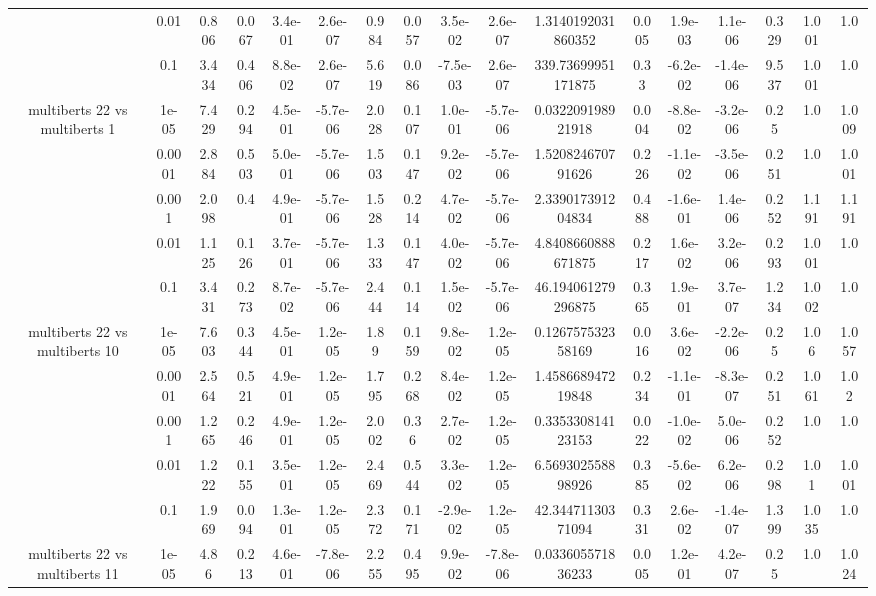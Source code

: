 \begin{tabular}{|c|c|c|c|c|c|c|c|c|c|c|c|c|c|c|c|c|}
 & 0.01 & 0.806 & 0.067 & 3.4e-01 & 2.6e-07 & 0.984 & 0.057 & 3.5e-02 & 2.6e-07 & 1.3140192031860352 & 0.005 & 1.9e-03 & 1.1e-06 & 0.329 & 1.001 & 1.0 \\
 & 0.1 & 3.434 & 0.406 & 8.8e-02 & 2.6e-07 & 5.619 & 0.086 & -7.5e-03 & 2.6e-07 & 339.73699951171875 & 0.33 & -6.2e-02 & -1.4e-06 & 9.537 & 1.001 & 1.0 \\
\hline
\multirow{5}{*}{multiberts 22 vs multiberts 1} & 1e-05 & 7.429 & 0.294 & 4.5e-01 & -5.7e-06 & 2.028 & 0.107 & 1.0e-01 & -5.7e-06 & 0.032209198921918 & 0.004 & -8.8e-02 & -3.2e-06 & 0.25 & 1.0 & 1.009 \\
 & 0.0001 & 2.884 & 0.503 & 5.0e-01 & -5.7e-06 & 1.503 & 0.147 & 9.2e-02 & -5.7e-06 & 1.520824670791626 & 0.226 & -1.1e-02 & -3.5e-06 & 0.251 & 1.0 & 1.001 \\
 & 0.001 & 2.098 & 0.4 & 4.9e-01 & -5.7e-06 & 1.528 & 0.214 & 4.7e-02 & -5.7e-06 & 2.339017391204834 & 0.488 & -1.6e-01 & 1.4e-06 & 0.252 & 1.191 & 1.191 \\
 & 0.01 & 1.125 & 0.126 & 3.7e-01 & -5.7e-06 & 1.333 & 0.147 & 4.0e-02 & -5.7e-06 & 4.8408660888671875 & 0.217 & 1.6e-02 & 3.2e-06 & 0.293 & 1.001 & 1.0 \\
 & 0.1 & 3.431 & 0.273 & 8.7e-02 & -5.7e-06 & 2.444 & 0.114 & 1.5e-02 & -5.7e-06 & 46.194061279296875 & 0.365 & 1.9e-01 & 3.7e-07 & 1.234 & 1.002 & 1.0 \\
\hline
\multirow{5}{*}{multiberts 22 vs multiberts 10} & 1e-05 & 7.603 & 0.344 & 4.5e-01 & 1.2e-05 & 1.89 & 0.159 & 9.8e-02 & 1.2e-05 & 0.126757532358169 & 0.016 & 3.6e-02 & -2.2e-06 & 0.25 & 1.06 & 1.057 \\
 & 0.0001 & 2.564 & 0.521 & 4.9e-01 & 1.2e-05 & 1.795 & 0.268 & 8.4e-02 & 1.2e-05 & 1.458668947219848 & 0.234 & -1.1e-01 & -8.3e-07 & 0.251 & 1.061 & 1.02 \\
 & 0.001 & 1.265 & 0.246 & 4.9e-01 & 1.2e-05 & 2.002 & 0.36 & 2.7e-02 & 1.2e-05 & 0.335330814123153 & 0.022 & -1.0e-02 & 5.0e-06 & 0.252 & 1.0 & 1.0 \\
 & 0.01 & 1.222 & 0.155 & 3.5e-01 & 1.2e-05 & 2.469 & 0.544 & 3.3e-02 & 1.2e-05 & 6.569302558898926 & 0.385 & -5.6e-02 & 6.2e-06 & 0.298 & 1.01 & 1.001 \\
 & 0.1 & 1.969 & 0.094 & 1.3e-01 & 1.2e-05 & 2.372 & 0.171 & -2.9e-02 & 1.2e-05 & 42.34471130371094 & 0.331 & 2.6e-02 & -1.4e-07 & 1.399 & 1.035 & 1.0 \\
\hline
\multirow{5}{*}{multiberts 22 vs multiberts 11} & 1e-05 & 4.86 & 0.213 & 4.6e-01 & -7.8e-06 & 2.255 & 0.495 & 9.9e-02 & -7.8e-06 & 0.033605571836233 & 0.005 & 1.2e-01 & 4.2e-07 & 0.25 & 1.0 & 1.024 \\

\end{tabular}
